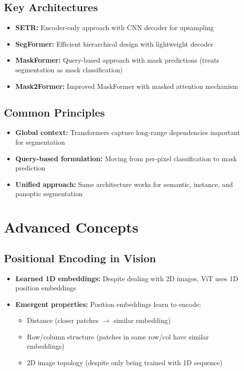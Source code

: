 \subsection*{Key Architectures}
\begin{itemize}
    \item \textbf{SETR:} Encoder-only approach with CNN decoder for upsampling
    \item \textbf{SegFormer:} Efficient hierarchical design with lightweight decoder
    \item \textbf{MaskFormer:} Query-based approach with mask predictions (treats segmentation as mask classification)
    \item \textbf{Mask2Former:} Improved MaskFormer with masked attention mechanism
\end{itemize}

\subsection*{Common Principles}
\begin{itemize}
    \item \textbf{Global context:} Transformers capture long-range dependencies important for segmentation
    \item \textbf{Query-based formulation:} Moving from per-pixel classification to mask prediction
    \item \textbf{Unified approach:} Same architecture works for semantic, instance, and panoptic segmentation
\end{itemize}

\section{Advanced Concepts}

\subsection*{Positional Encoding in Vision}
\begin{itemize}
    \item \textbf{Learned 1D embeddings:} Despite dealing with 2D images, ViT uses 1D position embeddings
    \item \textbf{Emergent properties:} Position embeddings learn to encode:
    \begin{itemize}
        \item Distance (closer patches $\rightarrow$ similar embedding)
        \item Row/column structure (patches in same row/col have similar embeddings)
        \item 2D image topology (despite only being trained with 1D sequence)
    \end{itemize}
\end{itemize}


